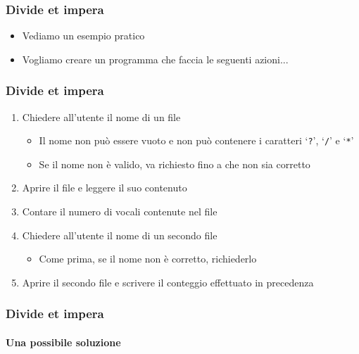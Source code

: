 \begin{exampleframe}
    \frametitle{Divide et impera}

    \begin{itemize}
        \item Vediamo un esempio pratico
        \bigskip
        \item Vogliamo creare un programma che faccia le seguenti azioni...
    \end{itemize}
\end{exampleframe}

\begin{exampleframe}
    \frametitle{Divide et impera}

    \begin{enumerate}
        \item Chiedere all'utente il nome di un file
        \begin{itemize}
            \item Il nome non può essere vuoto e non può contenere i caratteri `\texttt{?}', `\texttt{/}' e `\texttt{*}'
            \item Se il nome non è valido, va richiesto fino a che non sia corretto
        \end{itemize}
        \item Aprire il file e leggere il suo contenuto
        \item Contare il numero di vocali contenute nel file
        \item Chiedere all'utente il nome di un secondo file
        \begin{itemize}
            \item Come prima, se il nome non è corretto, richiederlo
        \end{itemize}
        \item Aprire il secondo file e scrivere il conteggio effettuato in precedenza
    \end{enumerate}
\end{exampleframe}

\begin{exampleframe}
    \frametitle{Divide et impera}
    \framesubtitle{Una possibile soluzione}

    \centering
\end{exampleframe}


